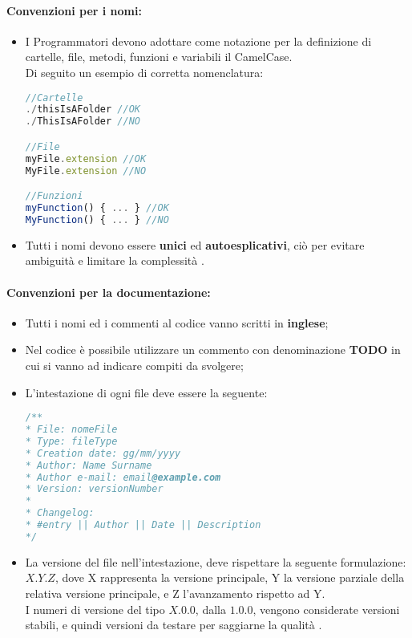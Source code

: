 \paragraph{Convenzioni per i nomi:}
\begin{itemize}	
	\item I Programmatori devono adottare come notazione per la definizione di cartelle, file, metodi, funzioni e variabili il CamelCase\glossario.\\
	Di seguito un esempio di corretta nomenclatura:
	\begin{lstlisting}[language=JavaScript]
//Cartelle 
./thisIsAFolder	//OK
./ThisIsAFolder //NO

//File
myFile.extension //OK
MyFile.extension //NO

//Funzioni
myFunction() { ... } //OK
MyFunction() { ... } //NO
	\end{lstlisting}

	\item Tutti i nomi devono essere \textbf{unici} ed \textbf{autoesplicativi}, ciò per evitare ambiguità  e limitare la complessità .
\end{itemize}
\paragraph{Convenzioni per la documentazione:}
\begin{itemize}	
	\item Tutti i nomi ed i commenti al codice vanno scritti in \textbf{inglese};
	\item Nel codice è possibile utilizzare un commento con denominazione \textbf{TODO} in cui si vanno ad indicare compiti da svolgere;
	\item L'intestazione di ogni file deve essere la seguente:
	\begin{lstlisting}[language=JavaScript]
/**
* File: nomeFile
* Type: fileType
* Creation date: gg/mm/yyyy
* Author: Name Surname
* Author e-mail: email@example.com
* Version: versionNumber 
*
* Changelog:
* #entry || Author || Date || Description
*/
	\end{lstlisting}
	\item La versione del file nell'intestazione, deve rispettare la seguente formulazione: $X.Y.Z$, dove X rappresenta la versione principale, Y la versione parziale della relativa versione principale, e Z l'avanzamento rispetto ad Y.\\ I numeri di versione del tipo $X.0.0$, dalla $1.0.0$, vengono considerate versioni stabili, e quindi versioni da testare per saggiarne la qualità .
\end{itemize}
